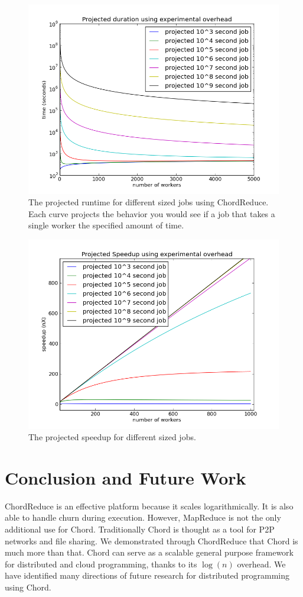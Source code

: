 \documentclass[conference, compsocconf, letterpaper]{IEEEtran}
\begin{document}
\begin{figure}
    \includegraphics[width=\linewidth]{projTime}
    \caption{The projected runtime for different sized jobs using ChordReduce.  Each curve projects the behavior you would see if a job that takes a single worker the specified amount of time.}
    \label{projTime}
\end{figure}

\begin{figure}
    \includegraphics[width=\linewidth]{projSpeed}
    \caption{The projected speedup for different sized jobs. }
    \label{projSpeed}
\end{figure}


\section{Conclusion and Future Work}
ChordReduce is an effective platform because it scales logarithmically.  It is also able to handle churn during execution.
However, MapReduce is not the only additional use for Chord.  Traditionally Chord is thought as a tool for P2P networks and file sharing.  We demonstrated through ChordReduce that Chord is much more than that.  Chord can serve as a scalable general purpose framework for distributed and cloud programming, thanks to its $\log(n)$ overhead.  We have identified many directions of future research for distributed programming using Chord.
\end{document}
